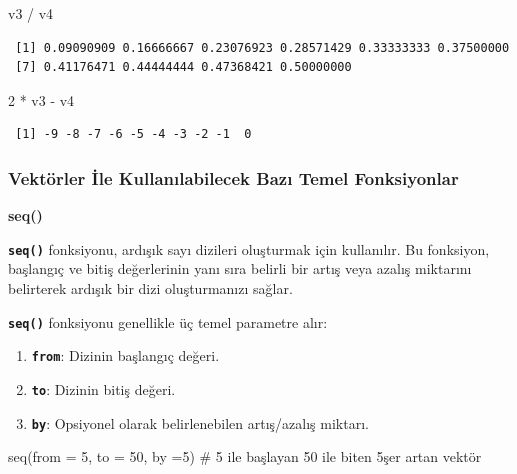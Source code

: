 \documentclass[
  letterpaper,
  DIV=11,
  numbers=noendperiod]{scrreprt}
\newenvironment{Shaded}{\begin{snugshade}}{\end{snugshade}}
\newcommand{\AttributeTok}[1]{\textcolor[rgb]{0.40,0.45,0.13}{#1}}
\newcommand{\CommentTok}[1]{\textcolor[rgb]{0.37,0.37,0.37}{#1}}
\newcommand{\DecValTok}[1]{\textcolor[rgb]{0.68,0.00,0.00}{#1}}
\newcommand{\FunctionTok}[1]{\textcolor[rgb]{0.28,0.35,0.67}{#1}}
\newcommand{\NormalTok}[1]{\textcolor[rgb]{0.00,0.23,0.31}{#1}}
\newcommand{\SpecialCharTok}[1]{\textcolor[rgb]{0.37,0.37,0.37}{#1}}
\begin{document}
\begin{Shaded}
\begin{Highlighting}[]
\NormalTok{v3 }\SpecialCharTok{/}\NormalTok{ v4}
\end{Highlighting}
\end{Shaded}

\begin{verbatim}
 [1] 0.09090909 0.16666667 0.23076923 0.28571429 0.33333333 0.37500000
 [7] 0.41176471 0.44444444 0.47368421 0.50000000
\end{verbatim}

\begin{Shaded}
\begin{Highlighting}[]
\DecValTok{2} \SpecialCharTok{*}\NormalTok{ v3 }\SpecialCharTok{{-}}\NormalTok{ v4}
\end{Highlighting}
\end{Shaded}

\begin{verbatim}
 [1] -9 -8 -7 -6 -5 -4 -3 -2 -1  0
\end{verbatim}

\hypertarget{vektuxf6rler-ile-kullanux131labilecek-bazux131-temel-fonksiyonlar}{%
\subsubsection{Vektörler İle Kullanılabilecek Bazı Temel
Fonksiyonlar}\label{vektuxf6rler-ile-kullanux131labilecek-bazux131-temel-fonksiyonlar}}

\textbf{seq()}

\textbf{\texttt{seq()}} fonksiyonu, ardışık sayı dizileri oluşturmak
için kullanılır. Bu fonksiyon, başlangıç ve bitiş değerlerinin yanı sıra
belirli bir artış veya azalış miktarını belirterek ardışık bir dizi
oluşturmanızı sağlar.

\textbf{\texttt{seq()}} fonksiyonu genellikle üç temel parametre alır:

\begin{enumerate}
\def\labelenumi{\arabic{enumi}.}
\item
  \textbf{\texttt{from}}: Dizinin başlangıç değeri.
\item
  \textbf{\texttt{to}}: Dizinin bitiş değeri.
\item
  \textbf{\texttt{by}}: Opsiyonel olarak belirlenebilen artış/azalış
  miktarı.
\end{enumerate}

\begin{Shaded}
\begin{Highlighting}[]
\FunctionTok{seq}\NormalTok{(}\AttributeTok{from =} \DecValTok{5}\NormalTok{, }\AttributeTok{to =} \DecValTok{50}\NormalTok{, }\AttributeTok{by =}\DecValTok{5}\NormalTok{) }\CommentTok{\# 5 ile başlayan 50 ile biten 5şer artan vektör}
\end{Highlighting}
\end{Shaded}
\end{document}
